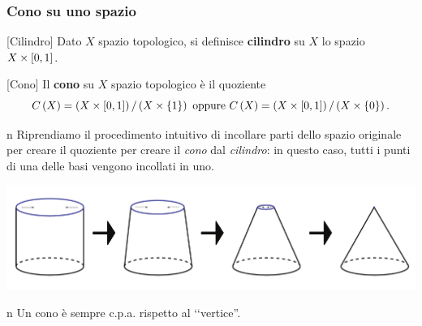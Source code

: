 \subsubsection{Cono su uno spazio}
\begin{definition}{}[Cilindro]
	Dato $X$ spazio topologico, si definisce \textbf{cilindro} su $X$ lo spazio $X\times \left[0, 1\right]$.
\end{definition}
\begin{definition}{}[Cono]
	Il \textbf{cono} su $X$ spazio topologico è il quoziente
	\begin{equation*}
		 C\left(X\right)=\left(X\times\unint\right)/\left(X\times\{1\}\right)\ \text{oppure}\ C\left(X\right)=\left(X\times\unint\right)/\left(X\times\{0\}\right).
	\end{equation*}
\end{definition}
\begin{intuitively}{n}
	Riprendiamo il procedimento intuitivo di incollare parti dello spazio originale per creare il quoziente per creare il \textit{cono} dal \textit{cilindro}: in questo caso, tutti i punti di una delle basi vengono incollati in uno.
\begin{center}
	\includegraphics[trim=0cm 0cm 0cm 0cm,clip,scale=0.4]{images/cilindertocone.pdf}
\end{center}
\end{intuitively}
\begin{remark}{n}
	Un cono è sempre c.p.a. rispetto al ‘‘vertice''.
\end{remark}
